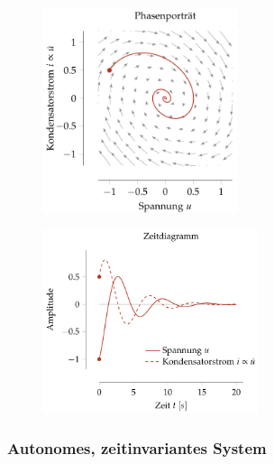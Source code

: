 \documentclass[
  10pt,
  a4paper,
  twocolumn]{article}
\numberwithin{equation}{section}
\begin{document}
\begin{figure}[H]

{\centering \includegraphics[width=5.7cm,height=\textheight]{images/state_space/quiver.png}

}

\end{figure}

\begin{figure}[H]

{\centering \includegraphics[width=6.3cm,height=\textheight]{images/state_space/time.png}

}

\end{figure}

\hypertarget{autonomes-zeitinvariantes-system}{%
\subsubsection{Autonomes, zeitinvariantes
System}\label{autonomes-zeitinvariantes-system}}

\begin{center}
\end{center}
\end{document}
